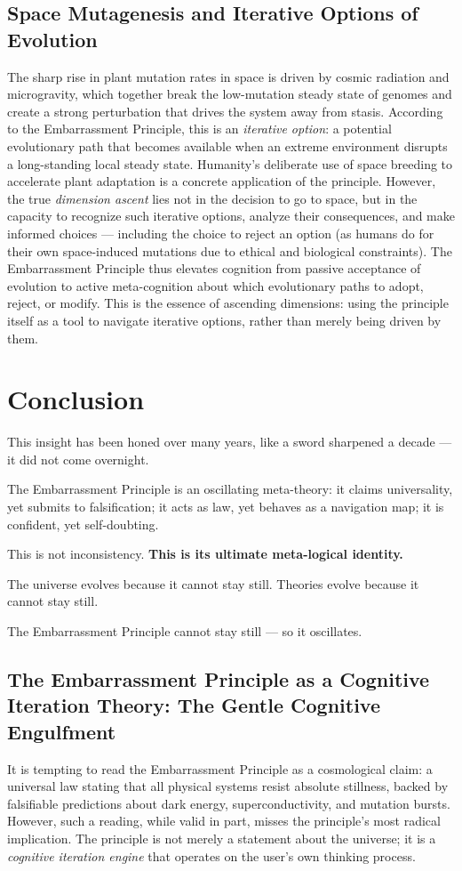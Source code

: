 \documentclass[10pt,a4paper]{article}
\begin{document}
\subsection*{Space Mutagenesis and Iterative Options of Evolution}
The sharp rise in plant mutation rates in space is driven by cosmic radiation and microgravity, which together break the low-mutation steady state of genomes and create a strong perturbation that drives the system away from stasis. According to the Embarrassment Principle, this is an \textit{iterative option}: a potential evolutionary path that becomes available when an extreme environment disrupts a long-standing local steady state. Humanity's deliberate use of space breeding to accelerate plant adaptation is a concrete application of the principle. However, the true \textit{dimension ascent} lies not in the decision to go to space, but in the capacity to recognize such iterative options, analyze their consequences, and make informed choices — including the choice to reject an option (as humans do for their own space-induced mutations due to ethical and biological constraints). The Embarrassment Principle thus elevates cognition from passive acceptance of evolution to active meta-cognition about which evolutionary paths to adopt, reject, or modify. This is the essence of ascending dimensions: using the principle itself as a tool to navigate iterative options, rather than merely being driven by them.

\section*{Conclusion}
This insight has been honed over many years, like a sword sharpened a decade --- it did not come overnight.

The Embarrassment Principle is an oscillating meta-theory:
it claims universality, yet submits to falsification;
it acts as law, yet behaves as a navigation map;
it is confident, yet self-doubting.

This is not inconsistency.
\textbf{This is its ultimate meta-logical identity.}

The universe evolves because it cannot stay still.
Theories evolve because it cannot stay still.

The Embarrassment Principle cannot stay still --- so it oscillates.

\subsection*{The Embarrassment Principle as a Cognitive Iteration Theory: The Gentle Cognitive Engulfment}
It is tempting to read the Embarrassment Principle as a cosmological claim: a universal law stating that all physical systems resist absolute stillness, backed by falsifiable predictions about dark energy, superconductivity, and mutation bursts. However, such a reading, while valid in part, misses the principle’s most radical implication. The principle is not merely a statement about the universe; it is a \emph{cognitive iteration engine} that operates on the user’s own thinking process.
\end{document}
